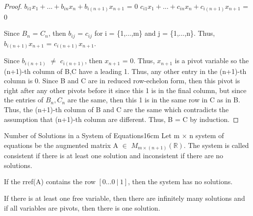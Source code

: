 \begin{proof}
        \hspace{0.5cm}
        $b_{i1}x_1 + ... + b_{in}x_n + b_{i(n+1)}x_{n+1}$ = 0
        \hspace{1cm}
        $c_{i1}x_1 + ... + c_{in}x_n + c_{i(n+1)}x_{n+1}$ = 0

        Since $B_n$ = $C_n$, then $b_{ij}$ = $c_{ij}$ for i = \{1,...,m\}
        and j = \{1,...,n\}. Thus,
        $b_{i(n+1)}x_{n+1}$ = $c_{i(n+1)}x_{n+1}$.

        Since $b_{i(n+1)}$ $\not =$ $c_{i(n+1)}$,
        then $x_{n+1}$ = 0. Thus, $x_{n+1}$ is a pivot variable so the (n+1)-th
        column of B,C have a leading 1. Thus, any other entry in the (n+1)-th
        column is 0. Since B and C are in reduced row-echelon form, then this
        pivot is right after any other pivots before it since this 1 is in
        the final column, but since the entries of $B_n,C_n$ are the same,
        then this 1 is in the same row in C as in B. Thus, the (n+1)-th column
        of B and C are the same which contradicts the assumption that
        (n+1)-th column are different. Thus, B = C
        by induction.
    \end{proof}

    \vspace{0.5cm}



    \begin{wtheorem}{Number of Solutions in a System of Equations}{16cm}
        Let m $\times$ n system of equations be the
        augmented matrix A $\in$ $M_{m \times (n+1)}(\mathbb{R})$.
        The system is called {\color{lblue} consistent} if there
        is at least one solution and {\color{lblue} inconsistent}
        if there are no solutions.

        \vspace{0.2cm}

        If the rref(A) contains the row $[0 ... 0 \ | \ 1]$, then
        the system has no solutions.

        If there is at least one free variable, then there are infinitely
        many solutions and if all variables are pivots,
        then there is one solution.
    \end{wtheorem}

